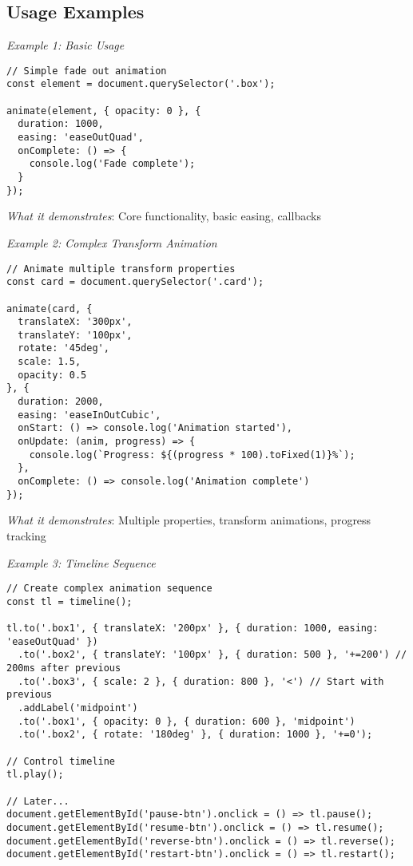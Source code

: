 \documentclass[11pt]{article}
\begin{document}
\subsection{Usage Examples}
\label{sec:orga76e6bd}

\emph{Example 1: Basic Usage}

\begin{verbatim}
// Simple fade out animation
const element = document.querySelector('.box');

animate(element, { opacity: 0 }, {
  duration: 1000,
  easing: 'easeOutQuad',
  onComplete: () => {
    console.log('Fade complete');
  }
});
\end{verbatim}

\emph{What it demonstrates}: Core functionality, basic easing, callbacks

\emph{Example 2: Complex Transform Animation}

\begin{verbatim}
// Animate multiple transform properties
const card = document.querySelector('.card');

animate(card, {
  translateX: '300px',
  translateY: '100px',
  rotate: '45deg',
  scale: 1.5,
  opacity: 0.5
}, {
  duration: 2000,
  easing: 'easeInOutCubic',
  onStart: () => console.log('Animation started'),
  onUpdate: (anim, progress) => {
    console.log(`Progress: ${(progress * 100).toFixed(1)}%`);
  },
  onComplete: () => console.log('Animation complete')
});
\end{verbatim}

\emph{What it demonstrates}: Multiple properties, transform animations, progress tracking

\emph{Example 3: Timeline Sequence}

\begin{verbatim}
// Create complex animation sequence
const tl = timeline();

tl.to('.box1', { translateX: '200px' }, { duration: 1000, easing: 'easeOutQuad' })
  .to('.box2', { translateY: '100px' }, { duration: 500 }, '+=200') // 200ms after previous
  .to('.box3', { scale: 2 }, { duration: 800 }, '<') // Start with previous
  .addLabel('midpoint')
  .to('.box1', { opacity: 0 }, { duration: 600 }, 'midpoint')
  .to('.box2', { rotate: '180deg' }, { duration: 1000 }, '+=0');

// Control timeline
tl.play();

// Later...
document.getElementById('pause-btn').onclick = () => tl.pause();
document.getElementById('resume-btn').onclick = () => tl.resume();
document.getElementById('reverse-btn').onclick = () => tl.reverse();
document.getElementById('restart-btn').onclick = () => tl.restart();
\end{verbatim}
\end{document}
